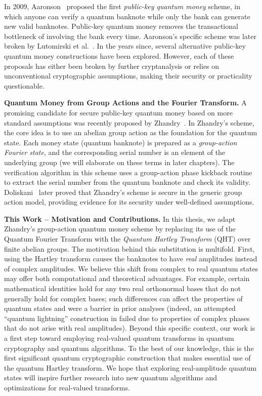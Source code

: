 \documentclass[12pt]{report}
\begin{document}
In 2009, Aaronson~\cite{Aaronson2009} proposed the first \emph{public-key quantum money} scheme, in which anyone can verify a quantum banknote while only the bank can generate new valid banknotes. Public-key quantum money removes the transactional bottleneck of involving the bank every time. Aaronson’s specific scheme was later broken by Lutomirski et al.~\cite{Lutomirski2010}. In the years since, several alternative public-key quantum money constructions have been explored. However, each of these proposals has either been broken by further cryptanalysis or relies on unconventional cryptographic assumptions, making their security or practicality questionable.

\medskip\noindent\textbf{Quantum Money from Group Actions and the Fourier Transform.} 
A promising candidate for secure public-key quantum money based on more standard assumptions was recently proposed by Zhandry~\cite{Zhandry2022}. In Zhandry’s scheme, the core idea is to use an abelian group action as the foundation for the quantum state. Each money state (quantum banknote) is prepared as a \emph{group-action Fourier state}, and the corresponding serial number is an element of the underlying group (we will elaborate on these terms in later chapters). The verification algorithm in this scheme uses a group-action phase kickback routine to extract the serial number from the quantum banknote and check its validity. Doliskani~\cite{Doliskani2023} later proved that Zhandry’s scheme is secure in the generic group action model, providing evidence for its security under well-defined assumptions.

\medskip\noindent\textbf{This Work – Motivation and Contributions.} 
In this thesis, we adapt Zhandry’s group-action quantum money scheme by replacing its use of the Quantum Fourier Transform with the \emph{Quantum Hartley Transform} (QHT) over finite abelian groups. The motivation behind this substitution is multifold. First, using the Hartley transform causes the banknotes to have \emph{real} amplitudes instead of complex amplitudes. We believe this shift from complex to real quantum states may offer both computational and theoretical advantages. For example, certain mathematical identities hold for any two real orthonormal bases that do not generally hold for complex bases; such differences can affect the properties of quantum states and were a barrier in prior analyses (indeed, an attempted “quantum lightning” construction in \cite{Zhandry2022} failed due to properties of complex phases that do not arise with real amplitudes). Beyond this specific context, our work is a first step toward employing real-valued quantum transforms in quantum cryptography and quantum algorithms. To the best of our knowledge, this is the first significant quantum cryptographic construction that makes essential use of the quantum Hartley transform. We hope that exploring real-amplitude quantum states will inspire further research into new quantum algorithms and optimizations for real-valued transforms.
\end{document}
